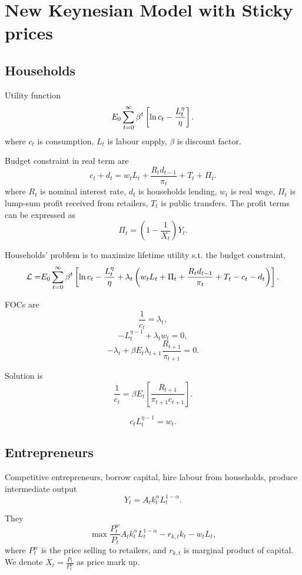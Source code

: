\documentclass{article}
\begin{document}
\section{New Keynesian Model with Sticky prices}

\subsection{Households}

Utility function%
\[
E_{0}\sum_{t=0}^{\infty }\beta ^{t}\left[ \ln c_{t}-\frac{L_{t}^{\eta }}{%
\eta }\right] . 
\]%
where $c_{t}$ is consumption, $L_{t}$ is labour supply, $\beta $ is discount
factor.

Budget constraint in real term are%
\[
c_{t}+d_{t}=w_{t}L_{t}+\frac{R_{t}d_{t-1}}{\pi _{t}}+T_{t}+\Pi _{t}.
\]%
where $R_{t}$ is nominal interest rate, $d_{t}$ is households lending, $w_{t}
$ is real wage, $\Pi _{t}$ is lump-sum profit received from retailers, $T_{t}
$ is public transfers. The profit terms can be expressed as%
\[
\Pi _{t}=\left( 1-\frac{1}{X_{t}}\right) Y_{t}.
\]

Households' problem is to maximize lifetime utility s.t. the budget
constraint,%
\[
\mathcal{L=}E_{0}\sum_{t=0}^{\infty }\beta ^{t}\left[ \ln c_{t}-\frac{%
L_{t}^{\eta }}{\eta }+\lambda _{t}\left( w_{t}L_{t}+\Pi _{t}+\frac{%
R_{t}d_{t-1}}{\pi _{t}}+T_{t}-c_{t}-d_{t}\right) \right] . 
\]

FOCs are%
\[
\frac{1}{c_{t}}=\lambda _{t}, 
\]%
\[
-L_{t}^{\eta -1}+\lambda _{t}w_{t}=0, 
\]%
\[
-\lambda _{t}+\beta E_{t}\lambda _{t+1}\frac{R_{t+1}}{\pi _{t+1}}=0. 
\]

Solution is%
\begin{equation}
\frac{1}{c_{t}}=\beta E_{t}\left[ \frac{R_{t+1}}{\pi _{t+1}c_{t+1}}\right] .
\label{Euler equation}
\end{equation}

\begin{equation}
c_{t}L_{t}^{\eta -1}=w_{t}.  \label{Labour supply}
\end{equation}

\subsection{Entrepreneurs}

Competitive entrepreneurs, borrow capital, hire labour from households,
produce intermediate output%
\[
Y_{t}=A_{t}k_{t}^{\alpha }L_{t}^{1-\alpha }. 
\]

They%
\[
\max \frac{P_{t}^{w}}{P_{t}}A_{t}k_{t}^{\alpha }L_{t}^{1-\alpha
}-r_{k,t}k_{t}-w_{t}L_{t},
\]%
where $P_{t}^{w}$ is the price selling to retailers, and $r_{k,t}$ is
marginal product of capital. We denote $X_{t}=\frac{P_{t}}{P_{t}^{w}}$ as
price mark up.
\end{document}
